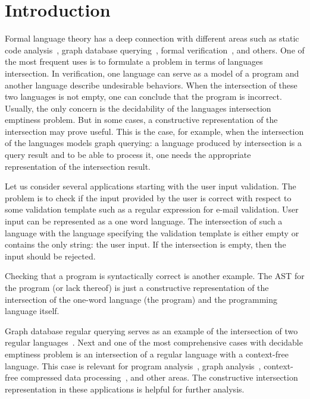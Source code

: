 \section{Introduction}

Formal language theory has a deep connection with different areas such as static code analysis~\cite{Reps:1995:PID:199448.199462,vardoulakis2010cfa2,Yan:2011:DCA:2001420.2001440,rehof2001type,lu2013incremental, pratikakis2006existential, zhang2017context}, graph database querying~\cite{hellingsRelational, hellingsPathQuerying,zhang2016context, koschmieder2012regular}, formal verification~\cite{10.1007/11730637_17, 10.1007/3-540-63141-0_10}, and others.
One of the most frequent uses is to formulate a problem in terms of languages intersection.
In verification, one language can serve as a model of a program and another language describe undesirable behaviors.
When the intersection of these two languages is not empty, one can conclude that the program is incorrect.
Usually, the only concern is the decidability of the languages intersection emptiness problem.
But in some cases, a constructive representation of the intersection may prove useful.
This is the case, for example, when the intersection of the languages models graph querying: a language produced by intersection is a query result and to be able to process it, one needs the appropriate representation of the intersection result.

Let us consider several applications starting with the user input validation.
The problem is to check if the input provided by the user is correct with respect to some validation template such as a regular expression for e-mail validation.
User input can be represented as a one word language.
The intersection of such a language with the language specifying the validation template is either empty or contains the only string: the user input.
If the intersection is empty, then the input should be rejected.

Checking that a program is syntactically correct is another example.
The AST for the program (or lack thereof) is just a constructive representation of the intersection of the one-word language (the program) and the programming language itself.

Graph database regular querying serves as an example of the intersection of two regular languages~\cite{ABITEBOUL1999428,koschmieder2012regular,alkhateeb:tel-00293206}.
Next and one of the most comprehensive cases with decidable emptiness problem is an intersection of a regular language with a context-free language.
This case is relevant for program analysis~\cite{Reps:1995:PID:199448.199462,vardoulakis2010cfa2,Yan:2011:DCA:2001420.2001440}, graph analysis~\cite{hellingsPathQuerying,zhang2016context,grigorev2016context}, context-free compressed data processing~\cite{MANETH201819}, and other areas.
The constructive intersection representation in these applications is helpful for further analysis.

